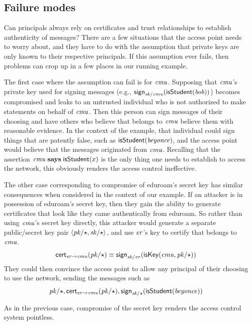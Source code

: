 \documentclass[11pt]{article}
\begin{document}
\subsection{Failure modes}

Can principals always rely on certificates and trust relationships to
establish authenticity of messages? There are a few situations that
the access point needs to worry about, and they have to do with the
assumption that private keys are only known to their respective
principals. If this assumption ever fails, then problems can crop up
in a few places in our running example.

The first case where the assumption can fail is for $\mathit{cmu}$. Supposing that
$\mathit{cmu}$'s private key used for signing messages (e.g.,
$\mathsf{sign}_{\mathit{sk/\mathit{cmu}}}(\mathsf{isStudent}(\mathit{bob}))$) becomes compromised and leaks to
an untrusted individual who is not authorized to make statements on behalf of
$\mathit{cmu}$. Then this person can sign messages of their choosing and have others
who believe that  belongs to $\mathit{cmu}$ believe them with reasonable
evidence. In the context of the example, that individual could sign things that
are patently false, such as $\mathsf{isStudent}(\mathit{beyonce})$, and the access point
would believe that the messages originated from $\mathit{cmu}$. Recalling that the
assertion $\mathit{cmu} \mathrel{\mathbf{says}} \mathsf{isStudent}(x)$ is the only thing one needs to
establish to access the network, this obviously renders the access control
ineffective.

The other case corresponding to compromise of eduroam's secret key has similar
consequences when considered in the context of our example. If an attacker is in
possession of eduroam's secret key, then they gain the ability to generate
certificates that look like they came authentically from eduroam. So rather than
using $\mathit{cmu}$'s secret key directly, this attacker would generate a separate
public/secret key pair $\langle \mathit{pk/\star},\mathit{sk/\star}\rangle$, and use
$\mathit{er}$'s key to certify that \pk{\star} belongs to $\mathit{cmu}$.
\[
  \mathsf{cert}_{{\mathit{er}} \mathbin{\rightarrow} {\mathit{cmu}}}(\mathit{pk/\star}) \equiv \mathsf{sign}_{\mathit{sk/\mathit{er}}}(\mathsf{isKey}(\mathit{cmu}, \mathit{pk/\star}))
\]
They could then convince the access point to allow any principal of
their choosing to use the network, sending the messages such as
\[
\mathit{pk/\star}, \mathsf{cert}_{{\mathit{er}} \mathbin{\rightarrow} {\mathit{cmu}}}(\mathit{pk/\star}), \mathsf{sign}_{\mathit{sk/\star}}(\mathsf{isStudent}(\mathit{beyonce}))
\]

As in the previous case, compromise of the secret key 
renders the access control system pointless.
\end{document}
